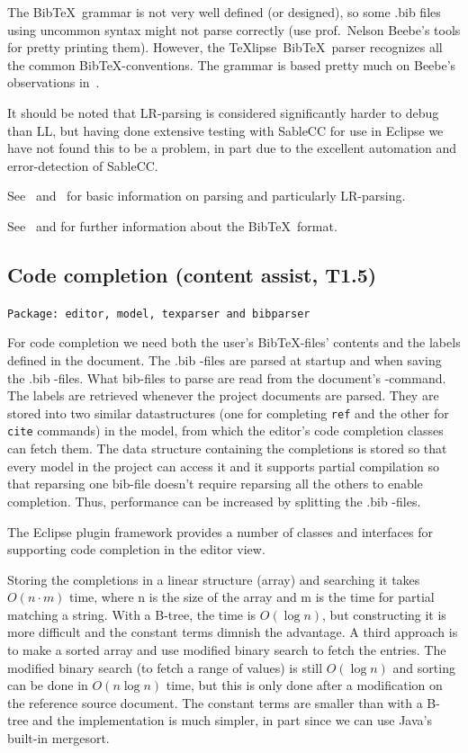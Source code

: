 \documentclass[a4paper,11pt,twoside]{article}
\newcommand{\texlipse}{\TeX lipse}
\begin{document}
The Bib\TeX\ grammar is not very well defined (or designed), so some .bib files 
using uncommon syntax might not parse correctly (use prof.\ Nelson Beebe's tools 
for pretty printing them). However, the \texlipse\ Bib\TeX\ parser recognizes 
all the common Bib\TeX -conventions. The grammar is based pretty much on 
Beebe's observations in~\cite{Beebe:TB14-4-395-419}.

It should be noted that LR-parsing is considered significantly harder to debug 
than LL, but having done extensive testing with SableCC for use in Eclipse we 
have not found this to be a problem, in part due to the excellent automation 
and error-detection of SableCC.

See~\cite{Aho:CPT86} and~\cite{Knuth:j-IC-8-6-607} for basic information 
on parsing and particularly LR-parsing.

See~\cite{Lamport:LDP85} and \cite{Patashnik:Bib-TUG-03-1} for further 
information about the Bib\TeX\ format.



\subsection{Code completion (content assist, T1.5)}
\label{sec:t1.5}

\texttt{Package: editor, model, texparser and bibparser}

For code completion we need both the user's Bib\TeX -files' contents and the 
labels defined in the document. The .bib -files are parsed at startup and when 
saving the .bib -files. What bib-files to parse are read from the document's 
\verb++ -command. The labels are retrieved whenever the project 
documents are parsed. They are stored into two similar datastructures (one for 
completing \texttt{ref} and the other for \texttt{cite} commands) in the model, 
from which the editor's code completion classes can fetch them. The data 
structure containing the completions is stored so that every model in the 
project can access it and it supports partial compilation so that reparsing 
one bib-file doesn't require reparsing all the others to enable completion. 
Thus, performance can be increased by splitting the .bib -files.

The Eclipse plugin framework provides a number of classes and interfaces for 
supporting code completion in the editor view.

Storing the completions in a linear structure (array) and searching it takes 
$O(n\cdot m)$ time, where n is the size of the array and m is the time for 
partial matching a string. With a B-tree, the time is $O(\log n)$, but 
constructing it is more difficult and the constant terms dimnish the advantage. 
A third approach is to make a sorted array and use modified binary search to 
fetch the entries. The modified binary search (to fetch a range of values) is 
still $O(\log n)$ and sorting can be done in $O(n\log n)$ time, but this is 
only done after a modification on the reference source document. The constant 
terms are smaller than with a B-tree and the implementation is much simpler, in 
part since we can use Java's built-in mergesort.
\end{document}
